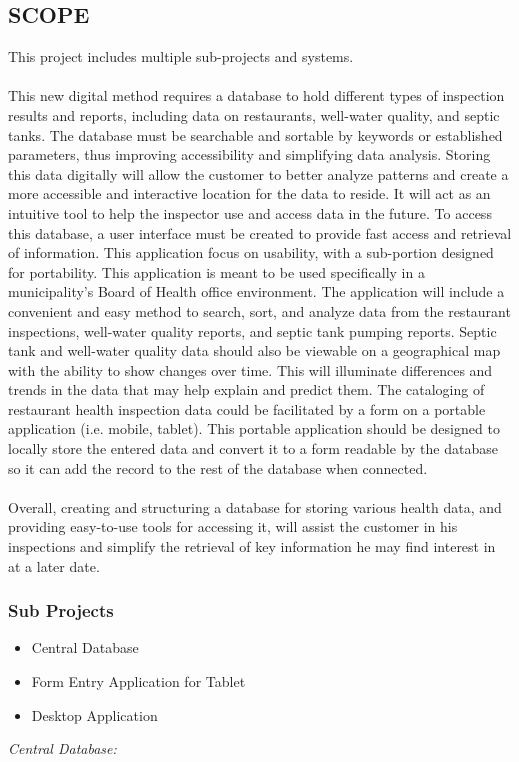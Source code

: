 \documentclass[twoside,letterpaper]{article}
\begin{document}
\subsection[PRODUCT SCOPE]{\rmfamily\bfseries\color{black}
SCOPE}
{\rmfamily\color{black}
This project includes multiple sub-projects and systems. 
\\     \\
This new digital method requires a database to hold different types of inspection results and reports, including data on restaurants, well-water quality, and septic tanks. The database must be searchable and sortable by keywords or established parameters, thus improving accessibility and simplifying data analysis. Storing this data digitally will allow the customer to better analyze patterns and create a more accessible and interactive location for the data to reside. It will act as an intuitive tool to help the inspector use and access data in the future. To access this database, a user interface must be created to provide fast access and retrieval of information. This application focus on usability, with a sub-portion designed for portability. This application is meant to be used specifically in a municipality's Board of Health office environment. The application will include a convenient and easy method to search, sort, and analyze data from the restaurant inspections, well-water quality reports, and septic tank pumping reports. Septic tank and well-water quality data should also be viewable on a geographical map with the ability to show changes over time. This will illuminate differences and trends in the data that may help explain and predict them. The cataloging of restaurant health inspection data could be facilitated by a form on a portable application (i.e. mobile, tablet). This portable application should be designed to locally store the entered data and convert it to a form readable by the database so it can add the record to the rest of the database when connected.
\\     \\ 
Overall, creating and structuring a database for storing various health data, and providing easy-to-use tools for accessing it, will assist the customer in his inspections and simplify the retrieval of key information he may find interest in at a later date.
\subsubsection{Sub Projects}
\begin{itemize}
\item{Central Database}
\item{Form Entry Application for Tablet}
\item{Desktop Application}
\end{itemize}
\textit{Central Database:}
\newline 

}
\end{document}
